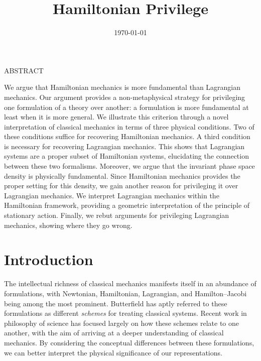 \documentclass[12pt, english, twoside]{article} %
\renewenvironment{abstract}
 {\small
  \begin{center}
\normalsize  \textnormal{ABSTRACT\\} \vspace{-0em}\vspace{0pt}
  \end{center}
  \list{}{%
    \setlength{\leftmargin}{0in}%
    \setlength{\rightmargin}{\leftmargin}%
  }%
  \item\relax}
 {\endlist}
\newcommand\bs{\begin{singlespace}}
\newcommand\es{\end{singlespace}}
\begin{document}
\title{\vspace{-2em} Hamiltonian Privilege}

\date{\vspace{-3em} \today}

\maketitle

\vspace{-3em}
\bs
\begin{abstract}
\noindent We argue that Hamiltonian mechanics is more fundamental than Lagrangian mechanics. Our argument provides a non-metaphysical strategy for privileging one formulation of a theory over another: a formulation is more fundamental at least when it is more general. We illustrate this criterion through a novel interpretation of classical mechanics in terms of three physical conditions. Two of these conditions suffice for recovering Hamiltonian mechanics. A third condition is necessary for recovering Lagrangian mechanics. This shows that Lagrangian systems are a proper subset of Hamiltonian systems, elucidating the connection between these two formalisms. Moreover, we argue that the invariant phase space density is physically fundamental. Since Hamiltonian mechanics provides the proper setting for this density, we gain another reason for privileging it over Lagrangian mechanics. We interpret Lagrangian mechanics within the Hamiltonian framework, providing a geometric interpretation of the principle of stationary action. Finally, we rebut arguments for privileging Lagrangian mechanics, showing where they go wrong. 
\end{abstract}
\es

\bs
\tableofcontents 
\es

\section{Introduction}
\label{introduction}


The intellectual richness of classical mechanics manifests itself in an abundance of formulations, with Newtonian, Hamiltonian, Lagrangian, and Hamilton--Jacobi being among the most prominent.  Butterfield \parencites*[]{Butterfield2004} has aptly referred to these formulations as different \textit{schemes} for treating classical systems. Recent work in philosophy of science has focused largely on how these schemes relate to one another, with the aim of arriving at a deeper understanding of classical mechanics. By considering the conceptual differences between these formulations, we can better interpret the physical significance of our representations.
\end{document}
